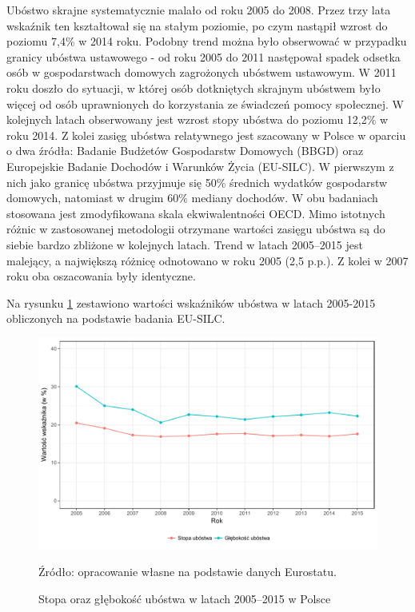 Ubóstwo skrajne systematycznie malało od roku 2005 do 2008. Przez trzy lata wskaźnik ten kształtował się na stałym poziomie, po czym nastąpił wzrost do poziomu 7,4\% w 2014 roku. Podobny trend można było obserwować w przypadku granicy ubóstwa ustawowego - od roku 2005 do 2011 następował spadek odsetka osób w gospodarstwach domowych zagrożonych ubóstwem ustawowym. W 2011 roku doszło do sytuacji, w której osób dotkniętych skrajnym ubóstwem było więcej od osób uprawnionych do korzystania ze świadczeń pomocy społecznej. W kolejnych latach obserwowany jest wzrost stopy ubóstwa do poziomu 12,2\% w roku 2014. Z kolei zasięg ubóstwa relatywnego jest szacowany w Polsce w oparciu o dwa źródła: Badanie Budżetów Gospodarstw Domowych (BBGD) oraz Europejskie Badanie Dochodów i Warunków Życia (EU-SILC). W pierwszym z nich jako granicę ubóstwa przyjmuje się 50\% średnich wydatków gospodarstw domowych, natomiast w drugim 60\% mediany dochodów. W obu badaniach stosowana jest zmodyfikowana skala ekwiwalentności OECD. Mimo istotnych różnic w zastosowanej metodologii otrzymane wartości zasięgu ubóstwa są do siebie bardzo zbliżone w kolejnych latach. Trend w latach 2005--2015 jest malejący, a największą różnicę odnotowano w roku 2005 (2,5 p.p.). Z kolei w 2007 roku oba oszacowania były identyczne.

Na rysunku \ref{fig:stopa_gleb} zestawiono wartości wskaźników ubóstwa w latach 2005-2015 obliczonych na podstawie badania EU-SILC.

\begin{figure}[ht]
\includegraphics[width=\textwidth]{01_wykresy/stopa_gleb-1.pdf}
\caption{Stopa oraz głębokość ubóstwa w latach 2005--2015 w Polsce}
\small{Źródło: opracowanie własne na podstawie danych Eurostatu.}
\label{fig:stopa_gleb}
\end{figure}

